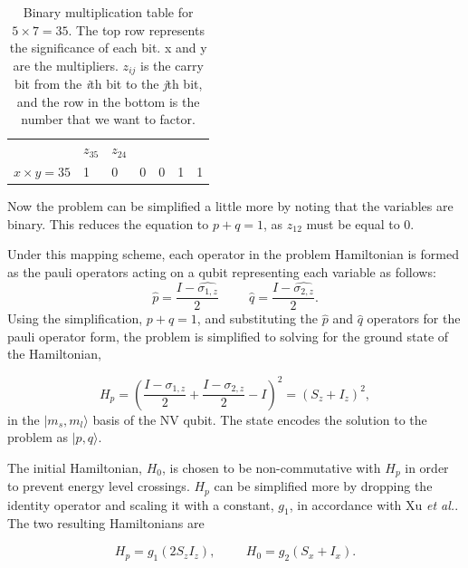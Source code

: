 \documentclass[%
 reprint,
 amsmath,amssymb,
 aps,
]{revtex4-1}
\begin{document}
\begin{table}[h]
\begin{flushleft}
\begin{tabular}{ p{1.7cm}  p{1cm} p{1cm} p{1cm} p{1cm} p{1cm} p{1cm}}
\hspace{0.1cm} &$z_{35}$ &$z_{24}$ &\hspace{0.1cm}  &\hspace{0.1cm} &\hspace{0.1cm} &\hspace{0.1cm} \\ 

$x \times y = 35$ &1 &0 &0 &0 &1 &1 \\ 
\hline
\end{tabular}
\end{flushleft}
\caption{Binary multiplication table for $ 5 \times 7 = 35 $. The top row represents the significance of each bit. x and y are the multipliers. $z_{ij}$ is the carry bit from the \textit{i}th bit to the \textit{j}th bit, and the row in the bottom is the number that we want to factor\cite{Xu2017}.
}
\label{tab:binmult}
\end{table}


	 Now the problem can be simplified a little more by noting that the variables are binary. This reduces the equation to $p+q=1$, as $z_{12}$ must be equal to 0.	 
	 
	  Under this mapping scheme, each operator in the problem Hamiltonian is formed as the pauli operators acting on a qubit representing each variable as follows:
	\begin{equation}
	  \hat{p} = \dfrac{I-\hat{\sigma_{1,z}}}{2} \hspace{1cm}   \hat{q} = \dfrac{I-\hat{\sigma_{2,z}}}{2}.
	\end{equation}
Using the simplification, $p+q=1$, and substituting the $\hat{p}$ and $\hat{q}$ operators for the pauli operator form, the problem is simplified to solving for the ground state of the Hamiltonian,
	
\begin{equation}
	H_p = \left( \dfrac{I-\sigma_{1,z}}{2} + \dfrac{I-\sigma_{2,z}}{2} - I\right)^2 = \left(S_z + I_z \right)^2 ,
\end{equation}
in the $\vert m_s,m_l \rangle$ basis of the NV qubit. The state encodes the solution to the problem as   $\vert p,q \rangle$.

	The initial Hamiltonian, $H_0$, is chosen to be non-commutative with $H_p$ in order to prevent energy level crossings. $H_p$ can be simplified more by dropping the identity operator and scaling it with a constant, $g_1$, in accordance with Xu \textit{et al.}. The two resulting Hamiltonians are

\begin{equation}
	H_p = g_1\left(2S_zI_z\right), \hspace{1cm} H_0 = g_2\left(S_x + I_x\right) .
\end{equation}
\end{document}

